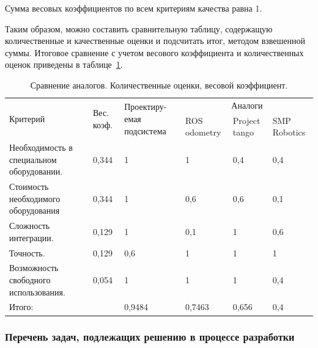 
Сумма весовых коэффициентов по всем критериям качества равна 1.

Таким образом, можно составить сравнительную таблицу, содержащую количественные и качественные оценки и подсчитать итог, методом взвешенной суммы.
Итоговое сравнение с учетом весового коэффициента и количественных оценок приведены в таблице~\ref{tab:srav_ves}.

\begin{table}[!Htb]
	\caption{Сравнение аналогов. Количественные оценки, весовой коэффициент.}\label{tab:srav_ves}
    \centering
	\begin{tabular}{|p{4cm}|p{2cm}|p{}|p{2cm}|p{2cm}|p{2cm}|}
	\hline 
	\multirow{2}{4cm}{Критерий} & \multirow{2}{2cm}{Вес. коэф. } & \multirow{2}{2,5cm}{Проектиру-емая подсистема} & 	\multicolumn{3}{c|}{Аналоги}\\ 
	\cline{4-6}
	 &  &   & ROS odometry & Project tango & SMP Robotics \\ 
	\hline 
	Необходимость в специальном оборудовании. & 0,344 & 1 & 1 & 0,4 & 0,4 \\ 
	\hline 
	Стоимость необходимого оборудования & 0,344 & 1 & 0,6 & 0,6 & 0,1 \\ 	
	\hline 
	Сложность интеграции. & 0,129 & 1 & 0,1 & 1 & 0,6 \\
	\hline 
	Точность. & 0,129 & 0,6 & 1 & 1 & 1 \\ 
	\hline 
	Возможность свободного использования. & 0,054 & 1 & 1 & 1 & 0,4 \\ 
	\hline 
	Итого: &  & 0,9484 & 0,7463 & 0,656 & 0,4 \\ 
	\hline 
	\end{tabular}
\end{table} 


\subsubsection{Перечень задач, подлежащих решению в процессе разработки}

